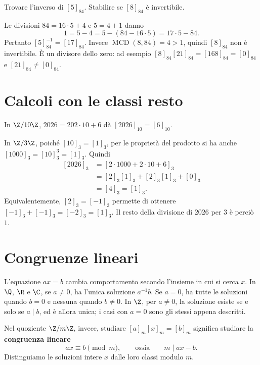 \begin{esercizio}
Trovare l'inverso di $[5]_{84}$. Stabilire se $[8]_{84}$ è invertibile.
\end{esercizio}
\begin{svolgimento}
Le divisioni $84=16\cdot5+4$ e $5=4+1$ danno
\[
1=5-4=5-(84-16\cdot5)=17\cdot5-84.
\]
Pertanto $[5]_{84}^{-1}=[17]_{84}$. Invece $\operatorname{MCD}(8,84)=4>1$, quindi $[8]_{84}$ non è invertibile. È un divisore dello zero: ad esempio $[8]_{84}[21]_{84}=[168]_{84}=[0]_{84}$ e $[21]_{84}\ne[0]_{84}$.
\end{svolgimento}

\section{Calcoli con le classi resto}
\begin{esempio}[Il numero 2026]
In $\Z/10\Z$, $2026=202\cdot10+6$ dà $[2026]_{10}=[6]_{10}$.

In $\Z/3\Z$, poiché $[10]_3=[1]_3$, per le proprietà del prodotto si ha anche $[1000]_3=[10]_3^3=[1]_3$. Quindi
\[
\begin{aligned}
[2026]_3&=[2\cdot1000+2\cdot10+6]_3\\
&=[2]_3[1]_3+[2]_3[1]_3+[0]_3\\
&=[4]_3=[1]_3.
\end{aligned}
\]
Equivalentemente, $[2]_3=[-1]_3$ permette di ottenere $[-1]_3+[-1]_3=[-2]_3=[1]_3$. Il resto della divisione di $2026$ per $3$ è perciò $1$.
\end{esempio}

\section{Congruenze lineari}
L'equazione $ax=b$ cambia comportamento secondo l'insieme in cui si cerca $x$. In $\Q$, $\R$ e $\C$, se $a\ne0$, ha l'unica soluzione $a^{-1}b$. Se $a=0$, ha tutte le soluzioni quando $b=0$ e nessuna quando $b\ne0$. In $\Z$, per $a\ne0$, la soluzione esiste se e solo se $a\mid b$, ed è allora unica; i casi con $a=0$ sono gli stessi appena descritti.

Nel quoziente $\Z/m\Z$, invece, studiare $[a]_m[x]_m=[b]_m$ significa studiare la \textbf{congruenza lineare}
\[
ax\equiv b\pmod m,\qquad\text{ossia}\qquad m\mid ax-b.
\]
Distinguiamo le soluzioni intere $x$ dalle loro classi modulo $m$.

